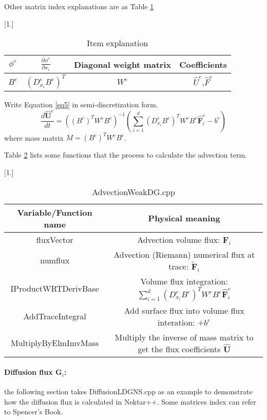 Other matrix index explanations are as Table \ref{table2}
\begin {table}[H]
\caption {Item explanation} \label{table2} 
\begin{center}
\scalebox{0.9}[1.]{
\begin{tabular}{| c|c|c|c|}
  \hline      
$\phi^{e}$ & $\frac{\partial \phi^{e}}{\partial x_{i}}$& Diagonal weight matrix & Coefficients\\
  \hline
$B^{e}$ &$(D^{e}_{x_{i}} B^{e})^{T}$& $W^{e}$& $\hat{U}^{e}$,$\hat{F}^{e}$\\
  \hline
\end{tabular}
}
\end{center}
\end{table}

Write Equation \eqref{eq5} in semi-discretization form.
\begin{equation}\label{eq8}
\frac{d \hat{\textbf{U}}^{e}}{d t}
=((B^{e})^{T}W^{e}B^{e})^{-1}(\sum\limits_{i=1}^{d}{(D^{e}_{x_{i}} B^{e})^{T}}W^{e}B^{e}\hat{\textbf{F}}^{e}_{i}-
b^{e})
\end{equation}
where mass matrix $M=(B^{e})^{T}W^{e}B^{e}$.

Table \ref{table1} lists some functions that the process to calculate the advection term.
\begin {table}[h]
\caption {AdvectionWeakDG.cpp} \label{table1} 
\begin{center}
\scalebox{0.9}[1.]{
\begin{tabular}{ | c | c|}
  \hline      
Variable/Function name & Physical meaning \\  
  \hline
  fluxVector  & Advection volume flux: $\textbf{F}_{i}$\\
  \hline
  numflux  & Advection (Riemann) numerical flux at trace: $\widetilde{\textbf{F}}_{i}$\\
   \hline
  IProductWRTDerivBase &  Volume flux integration: $\sum\limits_{i=1}^{d}{(D^{e}_{x_{i}} B^{e})^{T}}W^{e}B^{e}\hat{\textbf{F}}^{e}_{i}$ \\
   \hline
   AddTraceIntegral &  Add surface flux into volume flux interation: $+b^{e}$\\ 
  \hline
  MultiplyByElmImvMass& Multiply the inverse of mass matrix to get the flux coefficients $ \hat{\textbf{U}}$\\
 \hline
\end{tabular}
}
\end{center}
\end{table}


\paragraph{Diffusion flux $\textbf{G}_{i}$:}
the following section takes DiffusionLDGNS.cpp as an example to demonstrate how the diffusion flux is calculated in Nektar++. Some matrices index can refer to Spencer's Book.

